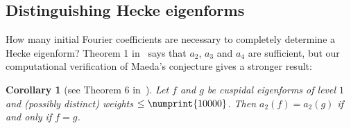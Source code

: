 \documentclass[11pt]{article}
\theoremstyle{plain}
\newtheorem{corollary}[theorem]{Corollary}
\theoremstyle{definition}
\theoremstyle{remark}
\numberwithin{equation}{section}
\begin{document}
\subsection{Distinguishing Hecke eigenforms}

How many initial Fourier coefficients are necessary to completely determine a
Hecke eigenform?  Theorem 1 in~\cite{Ghitza} says that $a_2$, $a_3$ and $a_4$
are sufficient, but our computational verification of Maeda's conjecture gives
a stronger result:

\begin{corollary}[see Theorem 6 in~\cite{Ghitza}]
  Let $f$ and $g$ be cuspidal eigenforms of level $1$ and (possibly distinct)
  weights
  $\leq\numprint{10000}$.  Then $a_2(f)=a_2(g)$ if and only if $f=g$.
\end{corollary}



\printbibliography
\end{document}
